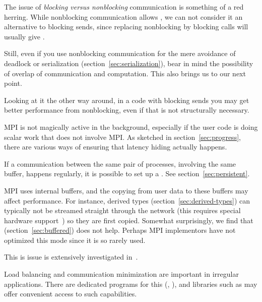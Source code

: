 %
The issue of
\emph{blocking versus nonblocking}
communication is something of a red herring. While nonblocking
communication allows , we can not
consider it an alternative to blocking sends, since replacing
nonblocking by blocking calls will usually give .

Still, even if you use nonblocking communication for the mere
avoidance of deadlock or serialization
(section~\ref{sec:serialization}), bear in mind the possibility of
overlap of communication and computation. This also brings us to our
next point.

Looking at it the other way around, in a code with blocking sends you
may get better performance from nonblocking, even if that is not
structurally necessary.


MPI is not magically active in the background, especially if the user
code is doing scalar work that does not involve MPI. As sketched in
section~\ref{sec:progress}, there are various ways of ensuring that
latency hiding actually happens.


If a communication between the same pair of processes, involving the
same buffer, happens regularly, it is possible to set up a
. See section~\ref{sec:persistent}.


MPI uses internal buffers, and the copying from user data to these
buffers may affect performance. For instance, derived types
(section~\ref{sec:derived-types}) can typically not be streamed
straight through the network (this requires special hardware
support~\cite{LI:MpiDataUMR}) so they are first copied. Somewhat
surprisingly, we find that 
(section~\ref{sec:buffered}) does not help. Perhaps MPI implementors
have not optimized this mode since it is so rarely used.

This is issue is extensively investigated in~\cite{Eijkhout:MPItype-arxiv}.


Load balancing and communication minimization are important in
irregular applications. There are dedicated programs for this
(, ), and libraries such as
 may offer convenient access to such capabilities.

